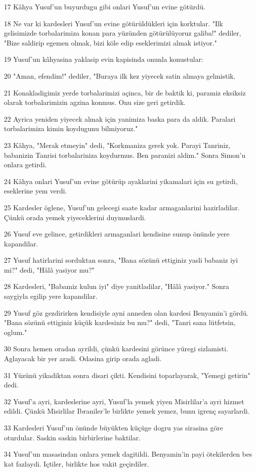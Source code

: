 \par 17 Kâhya Yusuf'un buyurdugu gibi onlari Yusuf'un evine götürdü.
\par 18 Ne var ki kardesleri Yusuf'un evine götürüldükleri için korktular. "Ilk gelisimizde torbalarimiza konan para yüzünden götürülüyoruz galiba!" dediler, "Bize saldirip egemen olmak, bizi köle edip eseklerimizi almak istiyor."
\par 19 Yusuf'un kâhyasina yaklasip evin kapisinda onunla konustular:
\par 20 "Aman, efendim!" dediler, "Buraya ilk kez yiyecek satin almaya gelmistik.
\par 21 Konakladigimiz yerde torbalarimizi açinca, bir de baktik ki, paramiz eksiksiz olarak torbalarimizin agzina konmus. Onu size geri getirdik.
\par 22 Ayrica yeniden yiyecek almak için yanimiza baska para da aldik. Paralari torbalarimiza kimin koydugunu bilmiyoruz."
\par 23 Kâhya, "Merak etmeyin" dedi, "Korkmaniza gerek yok. Parayi Tanriniz, babanizin Tanrisi torbalariniza koydurmus. Ben paranizi aldim." Sonra Simon'u onlara getirdi.
\par 24 Kâhya onlari Yusuf'un evine götürüp ayaklarini yikamalari için su getirdi, eseklerine yem verdi.
\par 25 Kardesler öglene, Yusuf'un gelecegi saate kadar armaganlarini hazirladilar. Çünkü orada yemek yiyeceklerini duymuslardi.
\par 26 Yusuf eve gelince, getirdikleri armaganlari kendisine sunup önünde yere kapandilar.
\par 27 Yusuf hatirlarini sorduktan sonra, "Bana sözünü ettiginiz yasli babaniz iyi mi?" dedi, "Hâlâ yasiyor mu?"
\par 28 Kardesleri, "Babamiz kulun iyi" diye yanitladilar, "Hâlâ yasiyor." Sonra saygiyla egilip yere kapandilar.
\par 29 Yusuf göz gezdirirken kendisiyle ayni anneden olan kardesi Benyamin'i gördü. "Bana sözünü ettiginiz küçük kardesiniz bu mu?" dedi, "Tanri sana lütfetsin, oglum."
\par 30 Sonra hemen oradan ayrildi, çünkü kardesini görünce yüregi sizlamisti. Aglayacak bir yer aradi. Odasina girip orada agladi.
\par 31 Yüzünü yikadiktan sonra disari çikti. Kendisini toparlayarak, "Yemegi getirin" dedi.
\par 32 Yusuf'a ayri, kardeslerine ayri, Yusuf'la yemek yiyen Misirlilar'a ayri hizmet edildi. Çünkü Misirlilar Ibraniler'le birlikte yemek yemez, bunu igrenç sayarlardi.
\par 33 Kardesleri Yusuf'un önünde büyükten küçüge dogru yas sirasina göre oturdular. Saskin saskin birbirlerine baktilar.
\par 34 Yusuf'un masasindan onlara yemek dagitildi. Benyamin'in payi ötekilerden bes kat fazlaydi. Içtiler, birlikte hos vakit geçirdiler.

